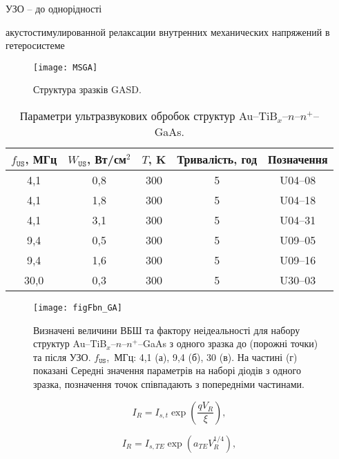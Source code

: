 \documentclass[a4paper,14pt,oneside,openany]{memoir}
\begin{document}
\cite{SBD:rizn}

УЗО -- до однорідності \cite{UST:SDErmol}

акустостимулированной релаксации внутренних механических напряжений в гетеросистеме \cite{BritunFTT}

\cite{Parchinskii2003r,Ostrov2002FTPr,Singh1994,Evstropov2000,Tseng1987}


\begin{figure}[b]
\center
\texttt{[image: MSGA]}%
\caption{\label{figMSGA}
Структура зразків GASD.
}
\end{figure}

\begin{table}
\caption{\label{tabUST}Параметри ультразвукових обробок структур Au--TiB$_x$--$n$--$n^+$--GaAs.
}
\center
\begin{tabular}{|c|c|c|c|c|}
\hline
$f_\mathtt{US}$, МГц&$W_{\mathtt{US}}$, Вт/см$^2$&$T$, K&Тривалість, год &Позначення\\
\hline
4,1&0,8&300&5&U04--08\\ \hline
4,1&1,8&300&5&U04--18\\ \hline
4,1&3,1&300&5&U04--31\\ \hline
9,4&0,5&300&5&U09--05\\ \hline
9,4&1,6&300&5&U09--16\\ \hline
30,0&0,3&300&5&U30--03\\ \hline
\end{tabular}
\end{table}



\begin{figure}
\center
\texttt{[image: figFbn\_GA]}%
\caption{\label{figFbn_GA}
Визначені величини ВБШ та фактору неідеальності для набору структур Au--TiB$_x$--$n$--$n^+$--GaAs
з одного зразка до (порожні точки) та після УЗО.
$f_\mathtt{US}$,~МГц: 4,1 (а), 9,4 (б), 30 (в).
На частині (г) показані Середні значення параметрів на наборі діодів з одного зразка,
позначення точок співпадають з попередніми частинами.
}
\end{figure}


\begin{equation}\label{eqIR1:GA}
I_R=I_{s,t}\exp\left(\frac{qV_R}{\xi}\right),
\end{equation}

\begin{equation}\label{eqIR2:GA}
I_R=I_{s,TE}\exp\left(a_{TE}V_R^{1/4}\right),
\end{equation}
\end{document}
